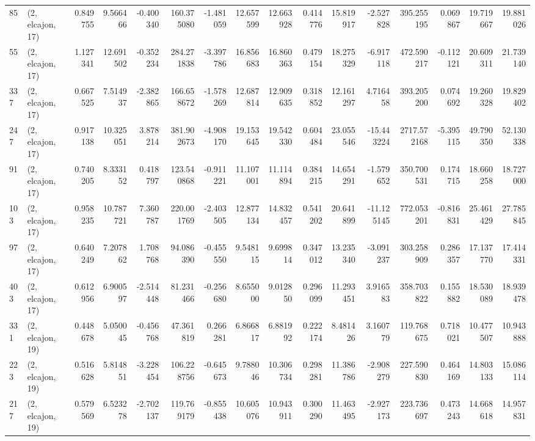 \begin{tabular}{llrrrrrrrrrrrrrr}
85  &  (2, elcajon, 17) &   0.849755 &   9.566466 &  -0.400340 &   160.375080 &  -1.481059 &  12.657599 &  12.663928 &  0.414776 &  15.819917 &  -2.527828 &   395.255195 &   0.069867 &  19.719667 &  19.881026 \\
55  &  (2, elcajon, 17) &   1.127341 &  12.691502 &  -0.352234 &   284.271838 &  -3.397786 &  16.856683 &  16.860363 &  0.479154 &  18.275329 &  -6.917118 &   472.590217 &  -0.112121 &  20.609311 &  21.739140 \\
337 &  (2, elcajon, 17) &   0.667525 &   7.514937 &  -2.382865 &   166.658672 &  -1.578269 &  12.687814 &  12.909635 &  0.318852 &  12.161297 &   4.716458 &   393.205200 &   0.074692 &  19.260328 &  19.829402 \\
247 &  (2, elcajon, 17) &   0.917138 &  10.325051 &   3.878214 &   381.902673 &  -4.908170 &  19.153645 &  19.542330 &  0.604484 &  23.055546 & -15.443224 &  2717.572168 &  -5.395115 &  49.790350 &  52.130338 \\
91  &  (2, elcajon, 17) &   0.740205 &   8.333152 &   0.418797 &   123.540868 &  -0.911221 &  11.107001 &  11.114894 &  0.384215 &  14.654291 &  -1.579652 &   350.700531 &   0.174715 &  18.660258 &  18.727000 \\
103 &  (2, elcajon, 17) &   0.958235 &  10.787721 &   7.360787 &   220.001769 &  -2.403505 &  12.877134 &  14.832457 &  0.541202 &  20.641899 & -11.125145 &   772.053201 &  -0.816831 &  25.461429 &  27.785845 \\
97  &  (2, elcajon, 17) &   0.640249 &   7.207862 &   1.708768 &    94.086390 &  -0.455550 &   9.548115 &   9.699814 &  0.347012 &  13.235340 &  -3.091237 &   303.258909 &   0.286357 &  17.137770 &  17.414331 \\
403 &  (2, elcajon, 17) &   0.612956 &   6.900597 &  -2.514448 &    81.231466 &  -0.256680 &   8.655000 &   9.012850 &  0.296099 &  11.293451 &   3.916583 &   358.703822 &   0.155882 &  18.530089 &  18.939478 \\
331 &  (2, elcajon, 19) &   0.448678 &   5.050045 &  -0.456768 &    47.361819 &   0.266281 &   6.866817 &   6.881992 &  0.222174 &   8.481426 &   3.160779 &   119.768675 &   0.718021 &  10.477507 &  10.943888 \\
223 &  (2, elcajon, 19) &   0.516628 &   5.814851 &  -3.228454 &   106.228756 &  -0.645673 &   9.788046 &  10.306734 &  0.298281 &  11.386786 &  -2.908279 &   227.590830 &   0.464169 &  14.803133 &  15.086114 \\
217 &  (2, elcajon, 19) &   0.579569 &   6.523278 &  -2.702137 &   119.769179 &  -0.855438 &  10.605076 &  10.943911 &  0.300290 &  11.463495 &  -2.927173 &   223.736697 &   0.473243 &  14.668618 &  14.957831 \\

\end{tabular}
